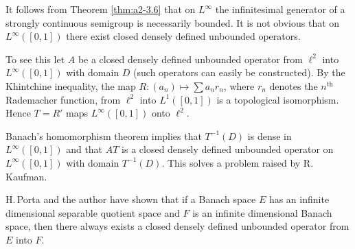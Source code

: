 \begin{remark*}[Final]\label{rem:a2-final}
It follows from Theorem \ref{thm:a2-3.6} that on $L^{\infty}$ the infinitesimal generator of a strongly continuous semigroup is necessarily bounded.
It is not obvious that on $L^{\infty}([0,1])$ there exist closed densely defined unbounded operators.

To see this let $A$ be a closed densely defined unbounded operator from $\ell^2$ into $L^{\infty}([0,1])$ with domain $D$ (such operators can easily be constructed).
By the Khintchine inequality, the map $R \colon (a_{n}) \mapsto \sum a_{n}r_{n}$, where $r_{n}$ denotes the $n^{\text{th}}$ Rademacher function, from $\ell^2$ into $L^1([0,1])$ is a topological isomorphism.
Hence $T = R'$ maps $L^{\infty}([0,1])$ onto $\ell^2$.

Banach's homomorphism theorem implies that $T^{-1}(D)$ is dense in $L^{\infty}([0,1])$ and that $AT$ is a closed densely defined unbounded operator on $L^{\infty}([0,1])$ with domain $T^{-1}(D)$.
This solves a problem raised by R.\, Kaufman.

H.\,Porta and the author have shown that if a Banach space $E$ has an infinite dimensional separable quotient space and $F$ is an infinite dimensional Banach space, then there always exists a closed densely defined unbounded operator from $E$ into $F$.
\end{remark*}
